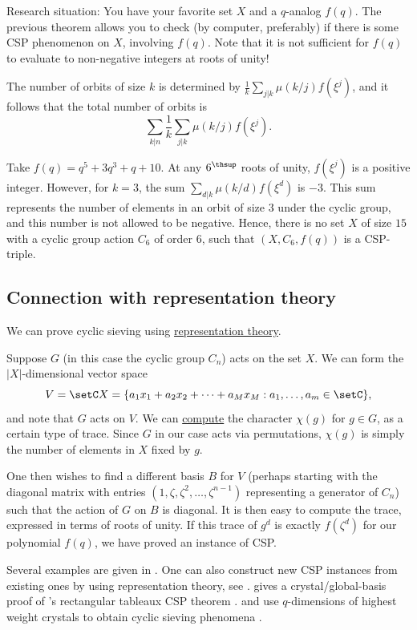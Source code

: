 Research situation: You have your favorite set $X$ and a $q$-analog $f(q)$.
The previous theorem allows you to check (by computer, preferably) if there is 
some CSP phenomenon on $X$, involving $f(q)$.
Note that it is not sufficient for $f(q)$ to evaluate to non-negative integers at roots of unity!

The number of orbits of size $k$ is determined by $\frac{1}{k}\sum_{j|k} \mu(k/j) f(\xi^j)$,
and it follows that the total number of orbits is 
\[
\sum_{k|n} \frac{1}{k}\sum_{j|k} \mu(k/j) f(\xi^j).
\]

\begin{example*}
 Take $f(q)=q^5+3q^3+q+10$.
 At any $6^\thsup$ roots of unity, $f(\xi^j)$ is a positive integer.
 However, for $k=3$, the sum $\sum_{d|k} \mu(k/d) f(\xi^d)$ is $-3$.
 This sum represents the number of elements in an orbit of size $3$ under the cyclic group,
 and this number is not allowed to be negative.
 Hence, there is no set $X$ of size $15$ with a cyclic group action $C_6$ of order $6$,
 such that $(X,C_6,f(q))$ is a CSP-triple.
\end{example*}


\subsection[cspAndRepTheory]{Connection with representation theory}

We can prove cyclic sieving using \hyperref[representationTheory]{representation theory}.

Suppose $G$ (in this case the cyclic group $C_n$) acts on the set $X$.
We can form the $|X|$-dimensional vector space 
\[
V = \setC X = \{a_1 x_1 + a_2x_2+\dotsb + a_M x_M : a_1,\dotsc,a_m \in \setC \},
\]
and note that $G$ acts on $V$.
We can \hyperref[computingSnCharacters]{compute} the character $\chi(g)$ for $g\in G$,
as a certain type of trace. Since $G$ in our case acts via
permutations, $\chi(g)$ is simply the number of elements in $X$ fixed by $g$.


One then wishes to find a different basis $B$ for $V$ (perhaps starting with the
diagonal matrix with entries $(1,\zeta,\zeta^2,\dotsc,\zeta^{n-1})$ representing a generator of $C_n$)
such that the action of $G$ on $B$ is diagonal. 
It is then easy to compute the trace, expressed in terms of roots of unity.
If this trace of $g^d$ is exactly $f(\zeta^d)$ for our polynomial $f(q)$, we have proved an instance of CSP.

Several examples are given in \cite{Sagan2011}.
One can also construct new CSP instances from existing ones by using representation theory,
see \cite{BergetEuReiner2011,ReinerStantonWhite2004}.
 gives a crystal/global-basis proof of
's rectangular tableaux CSP theorem
\cite{Rush2021}.
 and  use $q$-dimensions of highest
weight crystals to obtain cyclic sieving phenomena \cite{OhPark2020x}.



